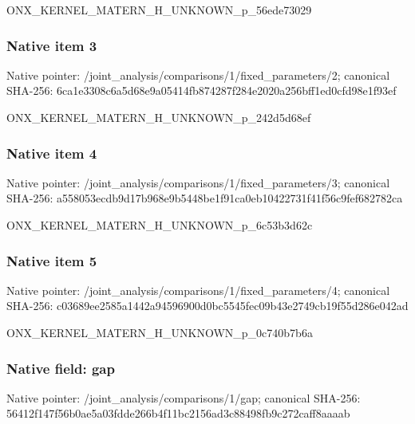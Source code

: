 \documentclass[10pt,a4paper]{article}
\begin{document}
\begingroup\raggedright\sloppy ONX\_\allowbreak{}KERNEL\_\allowbreak{}MATERN\_\allowbreak{}H\_\allowbreak{}UNKNOWN\_\allowbreak{}p\_\allowbreak{}56ede73029\par\endgroup

\subsubsection{Native item 3}
Native pointer: /joint\_\allowbreak{}analysis/comparisons/1/fixed\_\allowbreak{}parameters/2; canonical SHA-256: 6ca1e3308c6a5d68e9a05414fb874287f284e2020a256bff1ed0cfd98e1f93ef

\begingroup\raggedright\sloppy ONX\_\allowbreak{}KERNEL\_\allowbreak{}MATERN\_\allowbreak{}H\_\allowbreak{}UNKNOWN\_\allowbreak{}p\_\allowbreak{}242d5d68ef\par\endgroup

\subsubsection{Native item 4}
Native pointer: /joint\_\allowbreak{}analysis/comparisons/1/fixed\_\allowbreak{}parameters/3; canonical SHA-256: a558053ecdb9d17b968e9b5448be1f91ca0eb10422731f41f56c9fef682782ca

\begingroup\raggedright\sloppy ONX\_\allowbreak{}KERNEL\_\allowbreak{}MATERN\_\allowbreak{}H\_\allowbreak{}UNKNOWN\_\allowbreak{}p\_\allowbreak{}6c53b3d62c\par\endgroup

\subsubsection{Native item 5}
Native pointer: /joint\_\allowbreak{}analysis/comparisons/1/fixed\_\allowbreak{}parameters/4; canonical SHA-256: c03689ee2585a1442a94596900d0bc5545fec09b43e2749cb19f55d286e042ad

\begingroup\raggedright\sloppy ONX\_\allowbreak{}KERNEL\_\allowbreak{}MATERN\_\allowbreak{}H\_\allowbreak{}UNKNOWN\_\allowbreak{}p\_\allowbreak{}0c740b7b6a\par\endgroup

\subsubsection{Native field: gap}
Native pointer: /joint\_\allowbreak{}analysis/comparisons/1/gap; canonical SHA-256: 56412f147f56b0ae5a03fdde266b4f11bc2156ad3c88498fb9c272caff8aaaab
\end{document}
